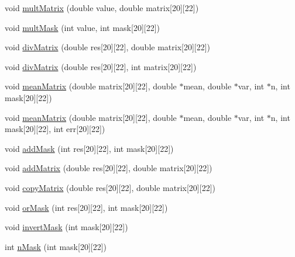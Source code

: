 \begin{DoxyCompactItemize}
\item 
void \hyperlink{classanalyseMatrix_ab6daa3c332d14b9d71b1208edfdf33cf}{mult\-Matrix} (double value, double matrix\mbox{[}20\mbox{]}\mbox{[}22\mbox{]})
\item 
void \hyperlink{classanalyseMatrix_a756d6af7a102bf5624589b118307b935}{mult\-Mask} (int value, int mask\mbox{[}20\mbox{]}\mbox{[}22\mbox{]})
\item 
void \hyperlink{classanalyseMatrix_ac1fa43f05dbc70125df4c63dcb65df29}{div\-Matrix} (double res\mbox{[}20\mbox{]}\mbox{[}22\mbox{]}, double matrix\mbox{[}20\mbox{]}\mbox{[}22\mbox{]})
\item 
void \hyperlink{classanalyseMatrix_a1f0cbad7de61b574221f1fddac3252e7}{div\-Matrix} (double res\mbox{[}20\mbox{]}\mbox{[}22\mbox{]}, int matrix\mbox{[}20\mbox{]}\mbox{[}22\mbox{]})
\item 
void \hyperlink{classanalyseMatrix_acb6421a2e698a280e19d751feca9faff}{mean\-Matrix} (double matrix\mbox{[}20\mbox{]}\mbox{[}22\mbox{]}, double $\ast$mean, double $\ast$var, int $\ast$n, int mask\mbox{[}20\mbox{]}\mbox{[}22\mbox{]})
\item 
void \hyperlink{classanalyseMatrix_a4ca419c0a8d92accfcd2ef1660497378}{mean\-Matrix} (double matrix\mbox{[}20\mbox{]}\mbox{[}22\mbox{]}, double $\ast$mean, double $\ast$var, int $\ast$n, int mask\mbox{[}20\mbox{]}\mbox{[}22\mbox{]}, int err\mbox{[}20\mbox{]}\mbox{[}22\mbox{]})
\item 
void \hyperlink{classanalyseMatrix_a25918ce9812bc346425cdcdb3d1f72bd}{add\-Mask} (int res\mbox{[}20\mbox{]}\mbox{[}22\mbox{]}, int mask\mbox{[}20\mbox{]}\mbox{[}22\mbox{]})
\item 
void \hyperlink{classanalyseMatrix_a821b829a991ad53d8b068d00ec411405}{add\-Matrix} (double res\mbox{[}20\mbox{]}\mbox{[}22\mbox{]}, double matrix\mbox{[}20\mbox{]}\mbox{[}22\mbox{]})
\item 
void \hyperlink{classanalyseMatrix_ae561bd929c3d2a0ceb1f3f1139bc533f}{copy\-Matrix} (double res\mbox{[}20\mbox{]}\mbox{[}22\mbox{]}, double matrix\mbox{[}20\mbox{]}\mbox{[}22\mbox{]})
\item 
void \hyperlink{classanalyseMatrix_a779d81ad2a1991688dfddde7011d6d06}{or\-Mask} (int res\mbox{[}20\mbox{]}\mbox{[}22\mbox{]}, int mask\mbox{[}20\mbox{]}\mbox{[}22\mbox{]})
\item 
void \hyperlink{classanalyseMatrix_aa454eb316f95fca25b72073020e04e36}{invert\-Mask} (int mask\mbox{[}20\mbox{]}\mbox{[}22\mbox{]})
\item 
int \hyperlink{classanalyseMatrix_a8c70c1c16f2482328b5bdc3e7b792034}{n\-Mask} (int mask\mbox{[}20\mbox{]}\mbox{[}22\mbox{]})

\end{DoxyCompactItemize}
